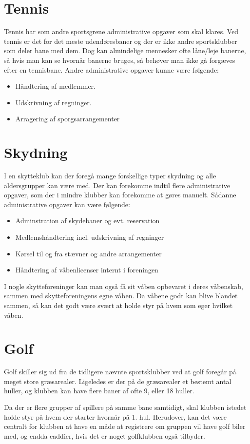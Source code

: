 \section{Tennis}
Tennis har som andre sportsgrene administrative opgaver som skal klares. Ved tennis er det for det meste udendøresbaner og der er ikke andre sportsklubber som deler bane med dem. Dog kan almindelige mennesker ofte låne/leje banerne, så hvis man kan se hvornår banerne bruges, så behøver man ikke gå forgæves efter en tennisbane.
Andre administrative opgaver kunne være følgende:
\begin{itemize}
\item Håndtering af medlemmer.
\item Udskrivning af regninger.
\item Arragering af sporgsarrangementer
\end{itemize}

\section{Skydning}
I en skytteklub kan der foregå mange forskellige typer skydning og alle aldersgrupper kan være med. Der kan forekomme indtil flere administrative opgaver, som der i mindre klubber kan forekomme at gøres manuelt. Sådanne administrative opgaver kan være følgende:
\begin{itemize}
\item Adminstration af skydebaner og evt. reservation
\item Medlemshåndtering incl. udskrivning af regninger
\item Kørsel til og fra stævner og andre arrangementer
\item Håndtering af våbenlicenser internt i foreningen
\end{itemize}
I nogle skytteforeninger kan man også få sit våben opbevaret i deres våbenskab, sammen med skytteforeningens egne våben. Da våbene godt kan blive blandet sammen, så kan det godt være svært at holde styr på hvem som eger hvilket våben.

\section{Golf}
Golf skiller sig ud fra de tidligere nævnte sportsklubber ved at golf foregår på meget store græsarealer. Ligeledes er der på de græsarealer et bestemt antal huller, og klubben kan have flere baner af ofte 9, eller 18 huller. 

Da der er flere grupper af spillere på samme bane samtidigt, skal klubben istedet holde styr på hvem der starter hvornår på 1. hul. Herudover, kan det være centralt for klubben at have en måde at registrere om gruppen vil have golf biler med, og endda caddier, hvis det er noget golfklubben også tilbyder.

